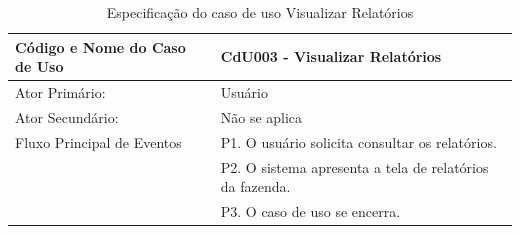 \documentclass[12pt]{article}
\begin{document}
\begin{titlepage}
\begin{center}
\begin{table}[!h]
	\begin{center}
		\caption{Especificação do caso de uso Visualizar Relatórios}
		\begin{tabular}{ | l |  p{10cm} |}
			\hline
			Código e Nome do Caso de Uso & CdU003 - Visualizar Relatórios \\ \hline
			Ator Primário: & Usuário \\ 
			Ator Secundário: & Não se aplica \\ \hline
			Fluxo Principal de Eventos & P1. O usuário solicita consultar os relatórios. \\
						   & P2. O sistema apresenta a tela de relatórios da fazenda. \\
						   & P3. O caso de uso se encerra. \\
			\hline
		\end{tabular}
	\end{center}
\end{table}

\newpage


\end{center}
\end{titlepage}
\end{document}
